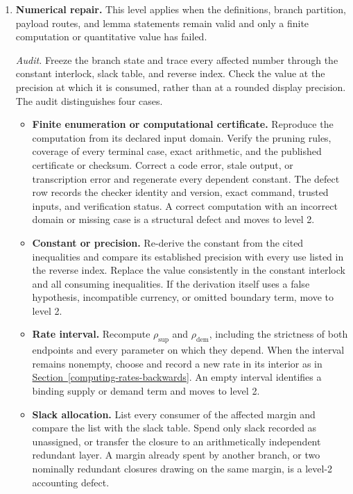 \documentclass[
  11pt,
]{article}
\theoremstyle{definition}
\newcommand{\secref}[1]{\hyperref[#1]{Section~\ref*{#1}}}
\begin{document}
\begin{enumerate}
\def\labelenumi{\arabic{enumi}.}
\item
  \textbf{Numerical repair.} This level applies when the definitions,
  branch partition, payload routes, and lemma statements remain valid
  and only a finite computation or quantitative value has failed.

  \emph{Audit.} Freeze the branch state and trace every affected number
  through the constant interlock, slack table, and reverse index. Check
  the value at the precision at which it is consumed, rather than at a
  rounded display precision. The audit distinguishes four cases.

  \begin{itemize}
  \item
    \textbf{Finite enumeration or computational certificate.} Reproduce
    the computation from its declared input domain. Verify the pruning
    rules, coverage of every terminal case, exact arithmetic, and the
    published certificate or checksum. Correct a code error, stale
    output, or transcription error and regenerate every dependent
    constant. The defect row records the checker identity and version,
    exact command, trusted inputs, and verification status. A correct
    computation with an incorrect domain or missing case is a structural
    defect and moves to level 2.
  \item
    \textbf{Constant or precision.} Re-derive the constant from the
    cited inequalities and compare its established precision with every
    use listed in the reverse index. Replace the value consistently in
    the constant interlock and all consuming inequalities. If the
    derivation itself uses a false hypothesis, incompatible currency, or
    omitted boundary term, move to level 2.
  \item
    \textbf{Rate interval.} Recompute
    \(\rho_{\mathrm{sup}}\) and \(\rho_{\mathrm{dem}}\), including the
    strictness of both endpoints and every parameter on which they
    depend. When the interval remains nonempty, choose and record a new
    rate in its interior as in \secref{computing-rates-backwards}. An
    empty interval identifies a binding supply or demand term and moves
    to level 2.
  \item
    \textbf{Slack allocation.} List every consumer of the affected
    margin and compare the list with the slack table. Spend only slack
    recorded as unassigned, or transfer the closure to an
    arithmetically independent redundant layer. A margin already spent
    by another branch, or two nominally redundant closures drawing on
    the same margin, is a level-2 accounting defect.
  \end{itemize}


\end{enumerate}
\end{document}
